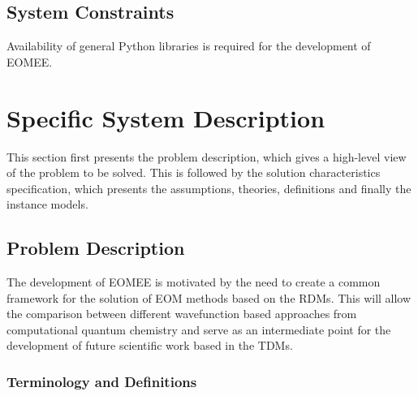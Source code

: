 \documentclass[12pt]{article}
\begin{document}
\subsection{System Constraints}


	Availability of general Python libraries is required for the development 
of EOMEE.

\section{Specific System Description}

This section first presents the problem description, which gives a high-level
view of the problem to be solved.  This is followed by the solution characteristics
specification, which presents the assumptions, theories, definitions and finally
the instance models.  

\subsection{Problem Description} \label{Sec_pd}

The development of EOMEE is motivated by the need to create a common framework 
for the solution of EOM methods based on the RDMs. This will allow the 
comparison between different wavefunction based approaches from computational 
quantum chemistry and serve as an intermediate point for the development of 
future scientific work based in the TDMs.\\

\subsubsection{Terminology and  Definitions}

\end{document}
